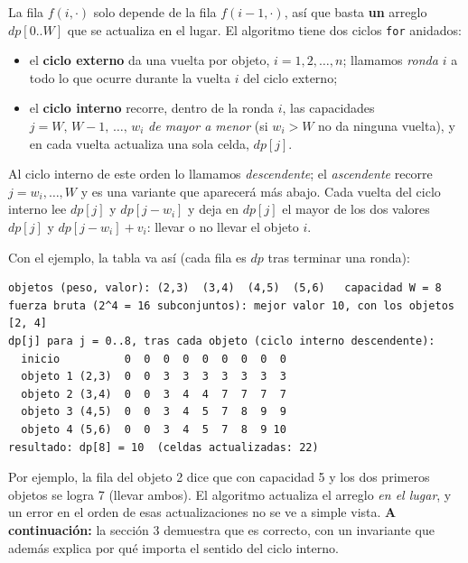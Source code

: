 \documentclass[11pt]{article}
\begin{document}
La fila $f(i,\cdot)$ solo depende de la fila $f(i-1,\cdot)$, así que basta \textbf{un} arreglo $dp[0..W]$ que se
actualiza en el lugar. El algoritmo tiene dos ciclos \texttt{for} anidados:
\begin{itemize}[leftmargin=14pt,itemsep=1pt]
\item el \textbf{ciclo externo} da una vuelta por objeto, $i=1,2,\dots,n$; llamamos \emph{ronda $i$} a todo lo
que ocurre durante la vuelta $i$ del ciclo externo;
\item el \textbf{ciclo interno} recorre, dentro de la ronda $i$, las capacidades $j=W,\,W-1,\,\dots,\,w_i$ \emph{de
mayor a menor} (si $w_i>W$ no da ninguna vuelta), y en cada vuelta actualiza una sola celda, $dp[j]$.
\end{itemize}
Al ciclo interno de este orden lo llamamos \emph{descendente}; el \emph{ascendente} recorre $j=w_i,\dots,W$ y es
una variante que aparecerá más abajo. Cada vuelta del ciclo interno lee $dp[j]$ y $dp[j-w_i]$ y deja en
$dp[j]$ el mayor de los dos valores $dp[j]$ y $dp[j-w_i]+v_i$: llevar o no llevar el objeto $i$.



\noindent\begin{minipage}{\linewidth}
Con el ejemplo, la tabla va así (cada fila es $dp$ tras terminar una ronda):
\begin{lstlisting}[style=salida,basicstyle=\ttfamily\footnotesize\color{black},columns=fixed]
objetos (peso, valor): (2,3)  (3,4)  (4,5)  (5,6)   capacidad W = 8
fuerza bruta (2^4 = 16 subconjuntos): mejor valor 10, con los objetos [2, 4]
dp[j] para j = 0..8, tras cada objeto (ciclo interno descendente):
  inicio          0  0  0  0  0  0  0  0  0
  objeto 1 (2,3)  0  0  3  3  3  3  3  3  3
  objeto 2 (3,4)  0  0  3  4  4  7  7  7  7
  objeto 3 (4,5)  0  0  3  4  5  7  8  9  9
  objeto 4 (5,6)  0  0  3  4  5  7  8  9 10
resultado: dp[8] = 10  (celdas actualizadas: 22)
\end{lstlisting}
\end{minipage}
Por ejemplo, la fila del objeto 2 dice que con capacidad 5 y los dos primeros objetos se logra 7 (llevar
ambos). El algoritmo actualiza el arreglo \emph{en el lugar}, y un error en el orden de esas actualizaciones no
se ve a simple vista. \textbf{A continuación:} la sección 3 demuestra que es correcto, con un invariante que además explica por qué importa el sentido del ciclo interno.

\end{document}
